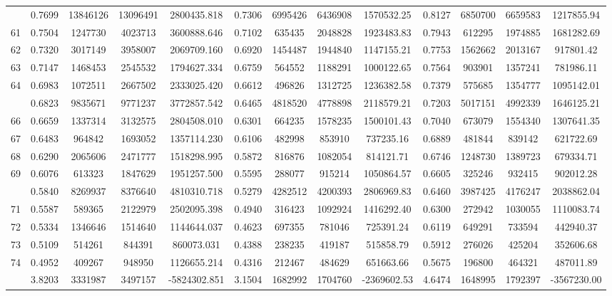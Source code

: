 \documentclass[
  12pt,
]{article}
\begin{document}
\begin{longtable}[t]{lcccccccccccc}
\addlinespace
60 & 0.7699 & 13846126 & 13096491 & 2800435.818 & 0.7306 & 6995426 & 6436908 & 1570532.25 & 0.8127 & 6850700 & 6659583 & 1217855.94\\
61 & 0.7504 & 1247730 & 4023713 & 3600888.646 & 0.7102 & 635435 & 2048828 & 1923483.83 & 0.7943 & 612295 & 1974885 & 1681282.69\\
62 & 0.7320 & 3017149 & 3958007 & 2069709.160 & 0.6920 & 1454487 & 1944840 & 1147155.21 & 0.7753 & 1562662 & 2013167 & 917801.42\\
63 & 0.7147 & 1468453 & 2545532 & 1794627.334 & 0.6759 & 564552 & 1188291 & 1000122.65 & 0.7564 & 903901 & 1357241 & 781986.11\\
64 & 0.6983 & 1072511 & 2667502 & 2333025.420 & 0.6612 & 496826 & 1312725 & 1236382.58 & 0.7379 & 575685 & 1354777 & 1095142.01\\
\addlinespace
65 & 0.6823 & 9835671 & 9771237 & 3772857.542 & 0.6465 & 4818520 & 4778898 & 2118579.21 & 0.7203 & 5017151 & 4992339 & 1646125.21\\
66 & 0.6659 & 1337314 & 3132575 & 2804508.010 & 0.6301 & 664235 & 1578235 & 1500101.43 & 0.7040 & 673079 & 1554340 & 1307641.35\\
67 & 0.6483 & 964842 & 1693052 & 1357114.230 & 0.6106 & 482998 & 853910 & 737235.16 & 0.6889 & 481844 & 839142 & 621722.69\\
68 & 0.6290 & 2065606 & 2471777 & 1518298.995 & 0.5872 & 816876 & 1082054 & 814121.71 & 0.6746 & 1248730 & 1389723 & 679334.71\\
69 & 0.6076 & 613323 & 1847629 & 1951257.500 & 0.5595 & 288077 & 915214 & 1050864.57 & 0.6605 & 325246 & 932415 & 902012.28\\
\addlinespace
70 & 0.5840 & 8269937 & 8376640 & 4810310.718 & 0.5279 & 4282512 & 4200393 & 2806969.83 & 0.6460 & 3987425 & 4176247 & 2038862.04\\
71 & 0.5587 & 589365 & 2122979 & 2502095.398 & 0.4940 & 316423 & 1092924 & 1416292.40 & 0.6300 & 272942 & 1030055 & 1110083.74\\
72 & 0.5334 & 1346646 & 1514640 & 1144644.037 & 0.4623 & 697355 & 781046 & 725391.24 & 0.6119 & 649291 & 733594 & 442940.37\\
73 & 0.5109 & 514261 & 844391 & 860073.031 & 0.4388 & 238235 & 419187 & 515858.79 & 0.5912 & 276026 & 425204 & 352606.68\\
74 & 0.4952 & 409267 & 948950 & 1126655.214 & 0.4316 & 212467 & 484629 & 651663.66 & 0.5675 & 196800 & 464321 & 487011.89\\
\addlinespace
75 & 3.8203 & 3331987 & 3497157 & -5824302.851 & 3.1504 & 1682992 & 1704760 & -2369602.53 & 4.6474 & 1648995 & 1792397 & -3567230.00\\*
\end{longtable}
\endgroup{}
\end{document}

